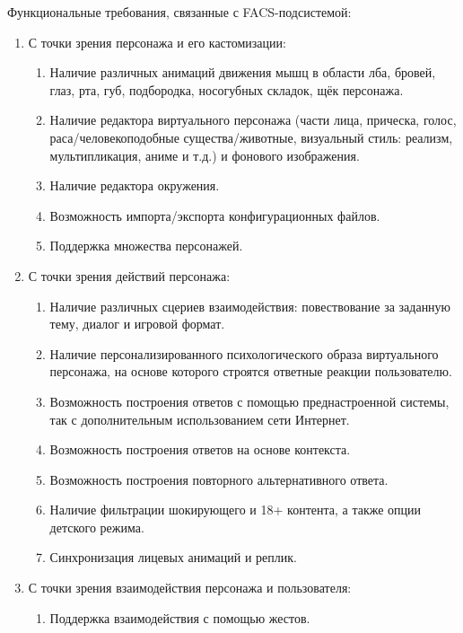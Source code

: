 \documentclass[a4paper,14pt]{extarticle}
\begin{document}
\begin{spacing}{1.5}
Функциональные требования, связанные с FACS-подсистемой:
\begin{enumerate}[label*=\arabic*.]    
    \item С точки зрения персонажа и его кастомизации:
        \begin{enumerate}[label*=\arabic*.]
            \item Наличие различных анимаций движения мышц в области лба, бровей, глаз, рта, губ, подбородка, носогубных складок, щёк персонажа.
            \item Наличие редактора виртуального персонажа (части лица, прическа, голос, раса/человекоподобные существа/животные, визуальный стиль: реализм, мультипликация, аниме и т.д.) {\color{BrickRed}и фонового изображения.}
            \item {\color{RoyalBlue}Наличие редактора окружения.}
            \item Возможность импорта/экспорта конфигурационных файлов.
            \item Поддержка множества персонажей.
        \end{enumerate}
    \item С точки зрения действий персонажа:
        \begin{enumerate}[label*=\arabic*.]
            \item Наличие различных сцериев взаимодействия: повествование за заданную тему, диалог и игровой формат.
            \item Наличие персонализированного психологического образа виртуального персонажа, на основе которого строятся ответные реакции пользователю.
            \item Возможность построения ответов с помощью преднастроенной системы, так с дополнительным использованием сети Интернет.
            \item Возможность построения ответов на основе контекста.
            \item Возможность построения повторного альтернативного ответа.
            \item Наличие фильтрации шокирующего и 18+ контента, а также опции детского режима.
            \item Синхронизация лицевых анимаций и реплик.
        \end{enumerate}
    \item С точки зрения взаимодействия персонажа и пользователя:
        \begin{enumerate}[label*=\arabic*.]
            \item Поддержка взаимодействия с помощью жестов.

\end{enumerate}
\end{enumerate}
\end{spacing}
\end{document}
